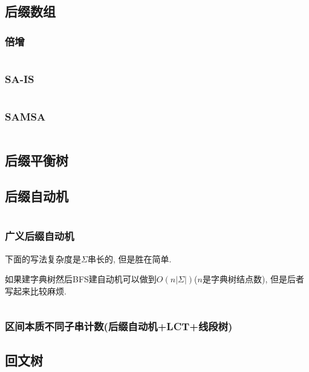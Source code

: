 \documentclass[a4paper, twoside]{article}
\begin{document}
\begin{multicols}{2}
			\subsection{后缀数组}
				\subsubsection{倍增}
					\inputminted{cpp}{../src/string/sa.cpp}	

				\subsubsection{SA-IS}
					\inputminted{cpp}{../src/string/sais.cpp}
			
				\subsubsection{SAMSA}
				 	\inputminted{cpp}{../src/string/SAMSA.cpp}

			\subsection{后缀平衡树}
				

			\subsection{后缀自动机}
				\inputminted{cpp}{../src/string/后缀自动机.cpp}

				\subsubsection{广义后缀自动机}
				下面的写法复杂度是$\Sigma$串长的, 但是胜在简单.
				
				如果建字典树然后BFS建自动机可以做到$O\left(n\left|\Sigma\right|\right)$($n$是字典树结点数), 但是后者写起来比较麻烦.
				\inputminted{cpp}{../src/string/广义后缀自动机.cpp}

				\subsubsection[区间本质不同子串计数]{区间本质不同子串计数(后缀自动机+LCT+线段树)}
					

			\subsection{回文树}
				\inputminted{cpp}{../src/string/回文树.cpp}


\end{multicols}
\end{document}
